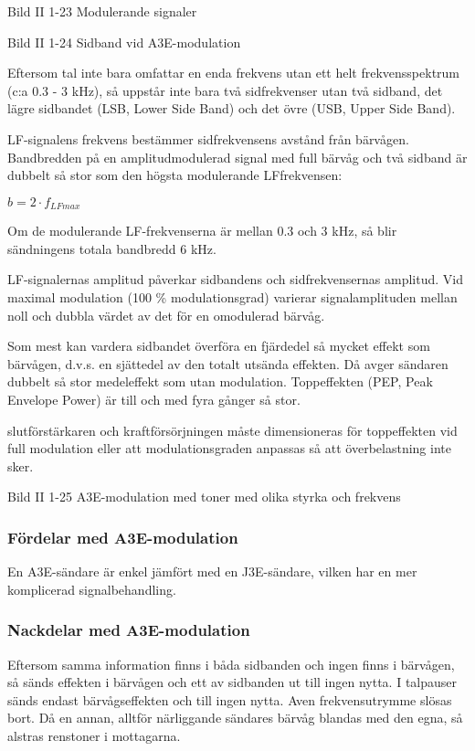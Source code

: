 Bild II 1-23 Modulerande signaler

Bild II 1-24 Sidband vid A3E-modulation

Eftersom tal inte bara omfattar en enda frekvens utan ett helt frekvensspektrum (c:a
0.3 - 3 kHz), så uppstår inte bara två sidfrekvenser utan två sidband, det lägre sidbandet
(LSB, Lower Side Band) och det övre (USB, Upper Side Band).

LF-signalens frekvens bestämmer sidfrekvensens avstånd från bärvågen. Bandbredden på en
amplitudmodulerad signal med full bärvåg och två sidband är dubbelt så stor som den högsta
modulerande LFfrekvensen:

\(b= 2 \cdot f_{LFmax}\)

Om de modulerande LF-frekvenserna är mellan 0.3 och 3 kHz, så blir sändningens
totala bandbredd 6 kHz.

LF-signalernas amplitud påverkar sidbandens och sidfrekvensernas amplitud. Vid
maximal modulation (100 \% modulationsgrad) varierar signalamplituden mellan noll
och dubbla värdet av det för en omodulerad bärvåg.

Som mest kan vardera sidbandet överföra en fjärdedel så mycket effekt som bärvågen, d.v.s.
en sjättedel av den totalt utsända effekten. Då avger sändaren dubbelt så stor medeleffekt
som utan modulation. Toppeffekten (PEP, Peak Envelope Power) är till och med fyra gånger
så stor.

slutförstärkaren och kraftförsörjningen måste dimensioneras för toppeffekten vid
full modulation eller att modulationsgraden anpassas så att överbelastning inte sker.

Bild II 1-25 A3E-modulation med toner med olika styrka och frekvens

\subsubsection{Fördelar med A3E-modulation}

En A3E-sändare är enkel jämfört med en J3E-sändare, vilken har en mer komplicerad
signalbehandling.

\subsubsection{Nackdelar med A3E-modulation}

Eftersom samma information finns i båda sidbanden och ingen finns i bärvågen, så sänds
effekten i bärvågen och ett av sidbanden ut till ingen nytta. I talpauser sänds endast
bärvågseffekten och till ingen nytta. Aven frekvensutrymme slösas bort. Då en annan,
alltför närliggande sändares bärvåg blandas med den egna, så alstras renstoner i
mottagarna.

